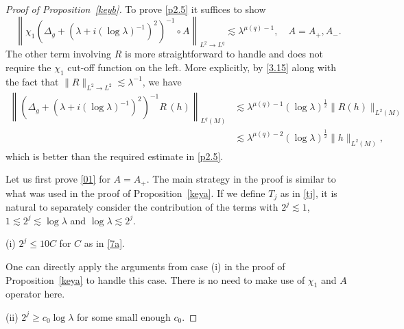 \documentclass[10pt]{amsart}
\newcommand{\la}{\lambda}
\newcommand{\1}{{\bf 1}}
\begin{document}
\begin{proof}[Proof of Proposition~\ref{keyb}]
To prove \eqref{p2.5} it suffices to show 
\begin{equation}\label{01}
    \left\|\chi_1\left(\Delta_g+(\la+i(\log\la)^{-1})^2\right)^{-1}\circ A\right\|_{L^2\to L^q}\lesssim \la^{\mu(q)-1}, \quad A=A_+, A_-.
\end{equation}
{{
The other term involving $R$ is more straightforward to handle and does not require the $\chi_1$ cut-off function on the left. More explicitly, by \eqref{3.15} along with the fact that $\|R\|_{L^2\to L^2}\lesssim\la^{-1}$, we have
\begin{equation}\label{n12b}
\begin{aligned}
       \left\|\left(\Delta_g+(\la+i(\log\la)^{-1})^2\right)^{-1} R \,(h)\right\|_{ L^q(M)}&\lesssim \la^{\mu(q)-1}(\log\la)^{\frac12}\|R( h)\|_{L^2( M)}\\
       &\lesssim 
   \la^{\mu(q)-2}(\log\la)^{\frac12} \| h\|_{L^2( M)},
\end{aligned}
\end{equation}
which is better than the required estimate in \eqref{p2.5}.}}

Let us first prove \eqref{01} for $A=A_+$.  The main strategy in the proof
is similar to what was used in the  proof of Proposition~\ref{keya}. If we define $T_j$ as in \eqref{tj}, it is natural to separately consider
the contribution of the terms with
$2^j\lesssim  1$, $1\lesssim  2^j\lesssim \log \la$ and $\log\la \lesssim 2^j$.


\noindent(i) $2^j\le 10C$ for $C$ as in \eqref{7a}.


One can directly apply the arguments from case (i) in the proof of Proposition~\ref{keya} to handle this case. There is no need to make use of $\chi_1$ and $A$ operator here. 


\noindent(ii) $2^j\ge c_0\log\la$ for some small enough $c_0$.



\end{proof}
\end{document}
